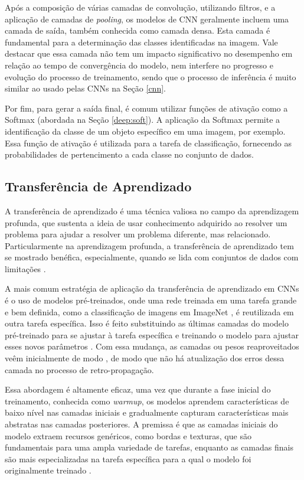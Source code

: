 Após a composição de várias camadas de convolução, utilizando filtros, e a aplicação de camadas de \textit{pooling}, os modelos de CNN geralmente incluem uma camada de saída, também conhecida como camada densa. Esta camada é fundamental para a determinação das classes identificadas na imagem. Vale destacar que essa camada não tem um impacto significativo no desempenho em relação ao tempo de convergência do modelo, nem interfere no progresso e evolução do processo de treinamento, sendo que o processo de inferência é muito similar ao usado pelas CNNs na Seção \ref{cnn}.

Por fim, para gerar a saída final, é comum utilizar funções de ativação como a Softmax (abordada na Seção \ref{deep:soft}). A aplicação da Softmax permite a identificação da classe de um objeto específico em uma imagem, por exemplo. Essa função de ativação é utilizada para a tarefa de classificação, fornecendo as probabilidades de pertencimento a cada classe no conjunto de dados.

\subsection{Transferência de Aprendizado}
\label{cnn:transfer}

A transferência de aprendizado é uma técnica valiosa no campo da aprendizagem profunda, que sustenta a ideia de usar conhecimento adquirido ao resolver um problema para ajudar a resolver um problema diferente, mas relacionado. Particularmente na aprendizagem profunda, a transferência de aprendizado tem se mostrado benéfica, especialmente, quando se lida com conjuntos de dados com limitações \citep{Pan2010}.

A mais comum estratégia de aplicação da transferência de aprendizado em CNNs é o uso de modelos pré-treinados, onde uma rede treinada em uma tarefa grande e bem definida, como a classificação de imagens em ImageNet \citep{Deng2009ImageNet:Database}, é reutilizada em outra tarefa específica. Isso é feito substituindo as últimas camadas do modelo pré-treinado para se ajustar à tarefa específica e treinando o modelo para ajustar esses novos parâmetros \citep{Yosinski2014HowNetworks}. Com essa mudança, as camadas ou pesos reaproveitados veêm inicialmente de modo , de modo que não há atualização dos erros dessa camada no processo de retro-propagação.

Essa abordagem é altamente eficaz, uma vez que durante a fase inicial do treinamento, conhecida como \textit{warmup}, os modelos aprendem características de baixo nível nas camadas iniciais e gradualmente capturam características mais abstratas nas camadas posteriores. A premissa é que as camadas iniciais do modelo extraem recursos genéricos, como bordas e texturas, que são fundamentais para uma ampla variedade de tarefas, enquanto as camadas finais são mais especializadas na tarefa específica para a qual o modelo foi originalmente treinado \citep{Yosinski2014HowNetworks}.

